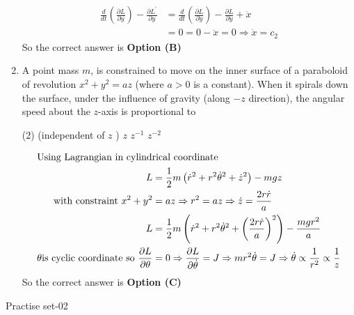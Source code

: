\begin{enumerate}
\begin{answer}
\begin{align*}
\frac{d}{d t}\left(\frac{\partial L}{\partial y}\right)-\frac{\partial L^{\prime}}{\partial y}&=\frac{d}{d t}\left(\frac{\partial L}{\partial \dot{y}}\right)-\frac{\partial L}{\partial y}+\ddot{x}\\&=0=0-\ddot{x}=0 \Rightarrow \dot{x}=c_{2}
\end{align*}
So the correct answer is \textbf{Option (B)}
\end{answer}	
\item A point mass $m$, is constrained to move on the inner surface of a paraboloid of revolution $x^{2}+y^{2}=a z$ (where $a>0$ is a constant). When it spirals down the surface, under the influence of gravity (along $-z$ direction), the angular speed about the $z$-axis is proportional to
{}
\begin{tasks}(2)
 (independent of $z$ )
\task[\textbf{B.}] $z$
\task[\textbf{C.}]  $z^{-1}$
\task[\textbf{D.}] $z^{-2}$
\end{tasks}
\begin{answer}
\begin{align*}
\intertext{Using Lagrangian in cylindrical coordinate}
L&=\frac{1}{2} m\left(\dot{r}^{2}+r^{2} \dot{\theta}^{2}+\dot{z}^{2}\right)-m g z \\\text{ with constraint }x^{2}+y^{2}&=a z \Rightarrow r^{2}=a z \Rightarrow \dot{z}=\frac{2 r \dot{r}}{a}\\
L&=\frac{1}{2} m\left(\dot{r}^{2}+r^{2} \dot{\theta}^{2}+\left(\frac{2 r \dot{r}}{a}\right)^{2}\right)-\frac{m g r^{2}}{a}\\
\theta \text{is cyclic coordinate so }\frac{\partial L}{\partial \theta}&=0 \Rightarrow \frac{\partial L}{\partial \dot{\theta}}=J \Rightarrow m r^{2} \dot{\theta}=J \Rightarrow \dot{\theta} \propto \frac{1}{r^{2}} \propto \frac{1}{z}
\end{align*}
So the correct answer is \textbf{Option (C)}
\end{answer}	
\end{enumerate}
\newpage
\begin{abox}
	Practise set-02
\end{abox}
